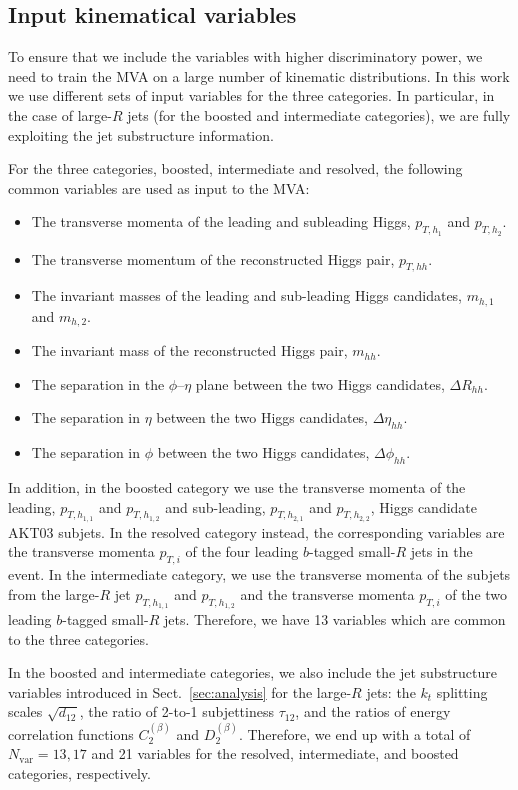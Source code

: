  \subsection{Input kinematical variables}
 \label{sec:input}

 To ensure that we include the variables with higher discriminatory power,
 we need to train
 the MVA on a large number of kinematic distributions.
%
In this work we use different sets of
input variables for the three categories.
%
In particular, in the case of large-$R$ jets (for the boosted
and intermediate categories), we are fully exploiting the jet
substructure information.

For the three categories, boosted, intermediate and resolved,
the following common variables are used as input to the MVA:
\begin{itemize}
\item The transverse momenta of the leading and subleading Higgs, $p_{T,h_1}$ and $p_{T,h_2}$.
\item The transverse momentum of the reconstructed Higgs pair, $p_{T,hh}$.
\item The invariant masses of the leading and sub-leading Higgs candidates, $m_{h,1}$ and $m_{h,2}$.
\item The invariant mass of the reconstructed Higgs pair, $m_{hh}$.
\item The separation in the $\phi$--$\eta$ plane
  between the two Higgs candidates, $\Delta R_{hh}$.
  \item The separation in $\eta$  between the two Higgs candidates, $\Delta \eta_{hh}$.
\item The separation in $\phi$  between the two Higgs candidates, $\Delta \phi_{hh}$.
\end{itemize}
In addition, in the boosted category we use
  the transverse momenta of the leading, $p_{T,h_{1,1}}$ and $p_{T,h_{1,2}}$ and
  sub-leading, $p_{T,h_{2,1}}$ and $p_{T,h_{2,2}}$, Higgs candidate AKT03 subjets.
  In the resolved category instead,
  the corresponding variables are
  the transverse momenta $p_{T,i}$ of the four leading 
  $b$-tagged small-$R$ jets in the event.
  In the intermediate category, we use the
  transverse momenta of the subjets
  from the large-$R$ jet $p_{T,h_{1,1}}$ and $p_{T,h_{1,2}}$ and the
 transverse momenta $p_{T,i}$ of the two leading 
  $b$-tagged small-$R$ jets.
 Therefore, we have 13 variables which are common to the three categories.

 In the boosted and intermediate categories, we also include the jet substructure
 variables introduced in Sect.~\ref{sec:analysis} for the
 large-$R$ jets: the $k_t$ splitting scales
 $\sqrt{d_{12}}$, the ratio of 2-to-1 subjettiness $\tau_{12}$,
 and the ratios of energy correlation functions $C^{(\beta)}_2$ and
 $D_2^{(\beta)}$.
 Therefore, we end up with
 a total of $N_{\mathrm{var}}=13,17$ and 21 variables for the
resolved, intermediate, and boosted categories, respectively.



